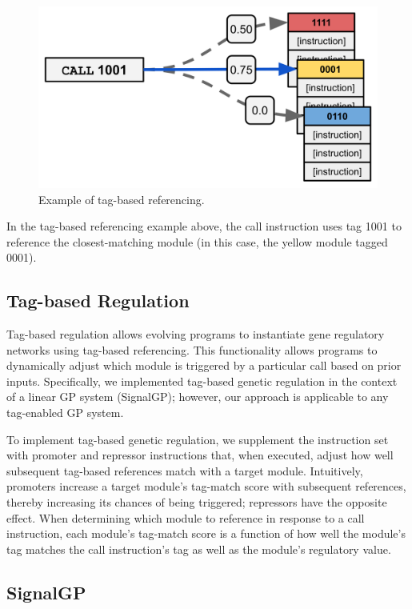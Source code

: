 \documentclass[]{book}
\begin{document}
\begin{figure}
\centering
\includegraphics{./media/tag-based-referencing.png}
\caption{Example of tag-based referencing.}
\end{figure}

In the tag-based referencing example above, the call instruction uses tag 1001 to reference the closest-matching module (in this case, the yellow module tagged 0001).

\hypertarget{tag-based-regulation}{%
\subsection{Tag-based Regulation}\label{tag-based-regulation}}

Tag-based regulation allows evolving programs to instantiate gene regulatory networks using tag-based referencing.
This functionality allows programs to dynamically adjust which module is triggered by a particular call based on prior inputs.
Specifically, we implemented tag-based genetic regulation in the context of a linear GP system (SignalGP); however, our approach is applicable to any tag-enabled GP system.

To implement tag-based genetic regulation, we supplement the instruction set with promoter and repressor instructions that, when executed, adjust how well subsequent tag-based references match with a target module.
Intuitively, promoters increase a target module's tag-match score with subsequent references, thereby increasing its chances of being triggered; repressors have the opposite effect.
When determining which module to reference in response to a call instruction, each module's tag-match score is a function of how well the module's tag matches the call instruction's tag as well as the module's regulatory value.

\hypertarget{signalgp}{%
\subsection{SignalGP}\label{signalgp}}
\end{document}
